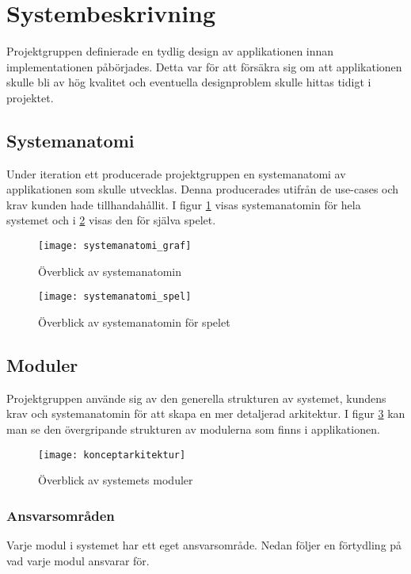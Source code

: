 
\section{Systembeskrivning}

Projektgruppen definierade en tydlig design av applikationen innan implementationen påbörjades. Detta var för att försäkra sig om att applikationen skulle bli av hög kvalitet och eventuella designproblem skulle hittas tidigt i projektet.

\subsection{Systemanatomi}
\label{beskrivning-systemanatomi}
Under iteration ett producerade projektgruppen en systemanatomi av applikationen som skulle utvecklas. Denna producerades utifrån de use-cases och krav kunden hade tillhandahållit. I figur \ref{fig:systemanatomi_graf} visas systemanatomin för hela systemet och i \ref{fig:systemanatomi_spel} visas den för själva spelet.

\begin{figure}[H]
    \centering
    \texttt{[image: systemanatomi\_graf]}
    \caption{Överblick av systemanatomin}
    \label{fig:systemanatomi_graf}
\end{figure}

\begin{figure}[H]
    \centering
    \texttt{[image: systemanatomi\_spel]}
    \caption{Överblick av systemanatomin för spelet}
    \label{fig:systemanatomi_spel}
\end{figure}


\pagebreak

\subsection{Moduler}
\label{moduler}
Projektgruppen använde sig av den generella strukturen av systemet, kundens krav och systemanatomin för att skapa en mer detaljerad arkitektur. I figur \ref{fig:konceptarkitektur} kan man se den övergripande strukturen av modulerna som finns i applikationen.

\begin{figure}[h]
    \centering
    \texttt{[image: konceptarkitektur]}
    \caption{Överblick av systemets moduler}
    \label{fig:konceptarkitektur}
\end{figure}

\pagebreak


\subsubsection*{Ansvarsområden}
Varje modul i systemet har ett eget ansvarsområde. Nedan följer en förtydling på vad varje modul ansvarar för.


